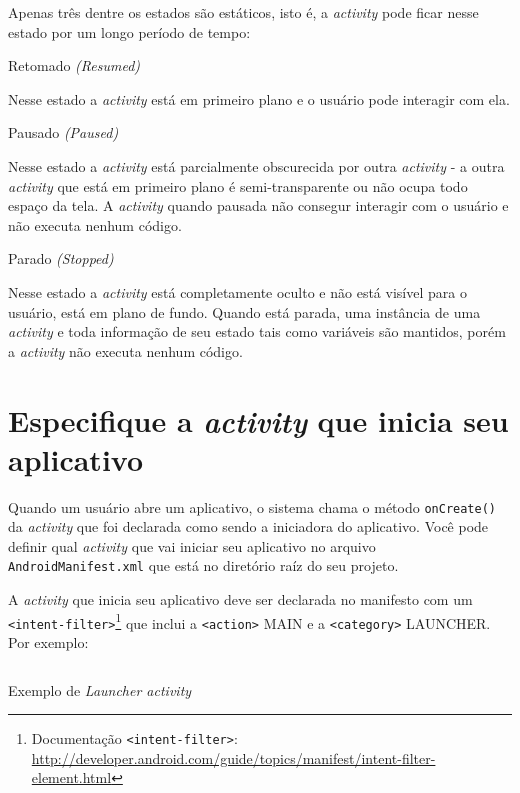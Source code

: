 \documentclass[a4paper,12pt,brazil,doubleside]{book}
\begin{document}
\begin{singlespace}
Apenas três dentre os estados são estáticos, isto é, a \emph{activity} pode ficar nesse estado por um longo período de tempo:


Retomado \emph{(Resumed)}
	
\hspace*{5mm} Nesse estado a \emph{activity} está em primeiro plano e o usuário pode interagir com ela.
	
Pausado \emph{(Paused)}
	
\hspace*{5mm} Nesse estado a \emph{activity} está parcialmente obscurecida por outra \emph{activity} - a outra \emph{activity} que está em primeiro plano é semi-transparente ou não ocupa todo espaço da tela. A \emph{activity} quando pausada não consegur interagir com o usuário e não executa nenhum código.
	
Parado \emph{(Stopped)}
	
\hspace*{5mm} Nesse estado a \emph{activity} está completamente oculto e não está visível para o usuário, está em plano de fundo. Quando está parada, uma instância de uma \emph{activity} e toda informação de seu estado tais como variáveis são mantidos, porém a \emph{activity} não executa nenhum código.
	
\section{Especifique a \emph{activity} que inicia seu aplicativo}

Quando um usuário abre um aplicativo, o sistema chama o método \texttt{onCreate()} da \emph{activity} que foi declarada como sendo a iniciadora do aplicativo. Você pode definir qual \emph{activity} que vai iniciar seu aplicativo no arquivo \texttt{AndroidManifest.xml} que está no diretório raíz do seu projeto.

 A \emph{activity} que inicia seu aplicativo deve ser declarada no manifesto com um \texttt{<intent-filter>}\footnote{Documentação \texttt{<intent-filter>}: \href{http://developer.android.com/guide/topics/manifest/intent-filter-element.html}{http://developer.android.com/guide/topics/manifest/intent-filter-element.html}} que inclui a \texttt{<action>} MAIN e a \texttt{<category>} LAUNCHER. Por exemplo:
 
\begin{listing}[H]
\inputminted[linenos=true,fontsize=\small,frame=lines, framesep=2mm, tabsize=2,numbersep=5pt]{xml}{src/design/launcher-manifest.xml}
\caption{Exemplo de \emph{Launcher activity}}
\end{listing}


\end{singlespace}
\end{document}
